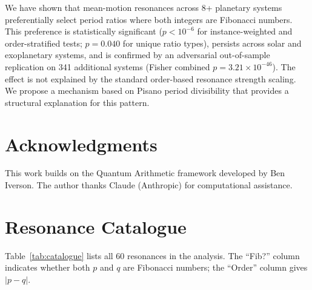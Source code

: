 \documentclass[twocolumn,11pt]{article}
\begin{document}
We have shown that mean-motion resonances across 8+ planetary systems
preferentially select period ratios where both integers are Fibonacci
numbers.  This preference is statistically significant ($p < 10^{-6}$
for instance-weighted and order-stratified tests; $p = 0.040$ for
unique ratio types), persists across solar and exoplanetary systems,
and is confirmed by an adversarial out-of-sample replication on 341
additional systems (Fisher combined $p = 3.21 \times 10^{-46}$).
The effect is not explained by the standard order-based resonance
strength scaling.  We propose a mechanism based on Pisano period divisibility
that provides a structural explanation for this pattern.

\section*{Acknowledgments}
This work builds on the Quantum Arithmetic framework developed by
Ben Iverson. The author thanks Claude (Anthropic) for computational
assistance.

\appendix
\section{Resonance Catalogue}

Table~\ref{tab:catalogue} lists all 60 resonances in the analysis.
The ``Fib?'' column indicates whether both $p$ and $q$ are Fibonacci
numbers; the ``Order'' column gives $|p-q|$.
\end{document}
